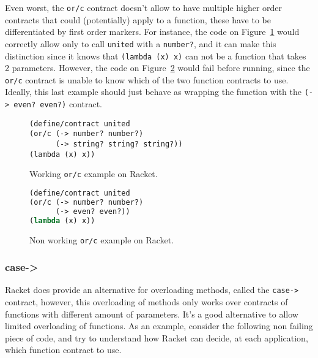 \documentclass[sigplan,10pt,review,anonymous]{acmart}
\newcommand{\unsure}[2][1=]{}
\newcommand{\racket}[1]{\lstinline[language=racket]{#1}}
\begin{document}
Even worst, the \racket{or/c} contract doesn't allow to have multiple higher order
contracts that could (potentially) apply to a function, these have to be
differentiated by first order markers.
For instance, the code on Figure~\ref{code:racket:or/c:working}
would correctly allow only to call
\racket{united} with a \racket{number?},
and it can make this distinction since it knows that
\racket{(lambda (x) x)} can not be a function that takes 2 parameters.
However, the code on Figure~\ref{code:racket:or/c:non-working} would fail
before running, since the \racket{or/c} contract is unable to know
which of the two function contracts to use.
Ideally, this last example should just behave as wrapping
the function with the \racket{(-> even? even?)} contract.

\begin{figure}[h]

\begin{lstlisting}[language=racket]
(define/contract united
(or/c (-> number? number?)
      (-> string? string? string?))
(lambda (x) x))
\end{lstlisting}
\caption{Working \racket{or/c} example on Racket.}
\label{code:racket:or/c:working}

\end{figure}

\begin{figure}[h]

\begin{lstlisting}[language=lisp]
(define/contract united
(or/c (-> number? number?)
      (-> even? even?))
(lambda (x) x))
\end{lstlisting}
\caption{Non working \racket{or/c} example on Racket.}
\label{code:racket:or/c:non-working}

\end{figure}


\unsure{This section is overall a bit hard to follow. I
  think I've figured out what it means, but it needs more love. Also
  give an example which doesn't work and one that does for or/c.}

\subsubsection*{case->}

Racket does provide an alternative for overloading methods, called the
\racket{case->} contract, however, this overloading of methods only
works over contracts of functions with different amount of parameters.
It's a good alternative to allow limited overloading of functions.
As an example, consider the following non failing piece of code, and
try to understand how Racket can decide, at each application,
which function contract to use.
\end{document}

